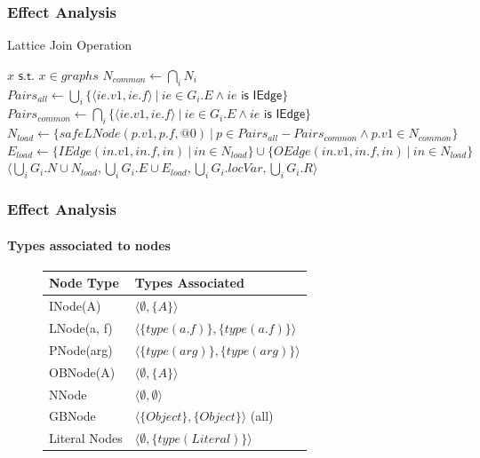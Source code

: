 \documentclass[hyperref={pdfpagelabels=false}]{beamer}
\begin{document}
\begin{frame}[fragile,shrink=20]
    \frametitle{Effect Analysis}
    \begin{algorithm}[H]
    \caption{Lattice Join Operation}\label{algo:pt:join}
    \begin{algorithmic}[1]
            \State \Return $x \textsf{ s.t. } x \in graphs$
        \Else
            \State $N_{common} \gets \bigcap_i N_i$
            \State $Pairs_{all} \gets  \bigcup_i \{ \langle ie.v1, ie.f \rangle ~|~ ie \in G_i.E \land ie \textsf { is IEdge}\}$
            \State $Pairs_{common} \gets  \bigcap_i \{ \langle ie.v1, ie.f \rangle ~|~ ie \in G_i.E \land ie \textsf { is IEdge}\}$
            \State $N_{load} \gets \{ safeLNode(p.v1, p.f, @0) ~|~ p \in Pairs_{all} - Pairs_{common} \land p.v1 \in N_{common} \}$
            \State $E_{load} \gets \{ IEdge(in.v1, in.f, in) ~|~ in \in N_{load} \} \cup \{ OEdge(in.v1, in.f, in) ~|~ in \in N_{load} \}$
            \State \Return $\langle \bigcup_i G_i.N \cup N_{load}, \bigcup_i G_i.E \cup E_{load}, \bigcup_i G_i.locVar , \bigcup_i G_i.R \rangle$
        \EndIf
    \EndFunction
    \end{algorithmic}
    \end{algorithm}
\end{frame}

\begin{frame}[fragile]
    \frametitle{Effect Analysis}
    \framesubtitle{Types associated to nodes}

    \begin{figure}[h]
        \centering

        \begin{tabular}{ l | l }
            Node Type & Types Associated \\
            \hline
            INode(A)           & $\langle \emptyset, \{A\}\rangle$ \\
            LNode(a, f)        & $\langle\{type(a.f)\}, \{type(a.f)\}\rangle$ \\
            PNode(arg)         & $\langle\{type(arg)\}, \{type(arg)\}\rangle$ \\
            OBNode(A)          & $\langle \emptyset,   \{A\}\rangle$ \\
            NNode              & $\langle \emptyset,   \emptyset \rangle$ \\
            GBNode             & $\langle\{Object\},   \{Object\}\rangle$ (all)\\
            Literal Nodes      & $\langle \emptyset,   \{type(Literal)\}\rangle$\\
        \end{tabular}
    \end{figure}

\end{frame}
\end{document}
